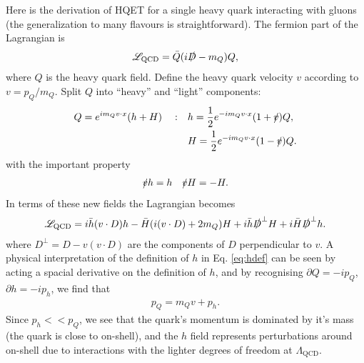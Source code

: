 Here is the derivation of HQET for a single heavy quark interacting with gluons (the generalization to many flavours is straightforward). The fermion part of the Lagrangian is
\begin{align}
  \mathscr{L}_{\text{QCD}} = \bar{Q} ( i\slashed{D} - m_Q ) Q,
  \label{eq:dirac}
\end{align}
where $Q$ is the heavy quark field. Define the heavy quark velocity $v$ according to $v = p_Q/m_Q$. Split $Q$ into ``heavy'' and ``light'' components:
\begin{align}
  \label{eq:hdef}
  Q = e^{im_Q v\cdot x}(h + H)\quad : \quad &h = {1\over 2} e^{-im_Q v\cdot x} ( 1 + \slashed{v} ) Q, \\
  &H = {1\over 2} e^{-im_Q v\cdot x} ( 1 - \slashed{v} ) Q.
\end{align}
with the important property
\begin{align}
  \slashed{v} h = h \quad \slashed{v} H = - H.
\end{align}
In terms of these new fields the Lagrangian becomes
\begin{align}
  \mathscr{L}_{\text{QCD}} = i\bar{h} (v\cdot D) h - \bar{H} ( i(v\cdot D) + 2m_Q ) H
  + i \bar{h} \slashed{D}^{\perp} H + i \bar{H} \slashed{D}^{\perp} h.
  \label{eq:HQET_preintegral}
\end{align}
where $D^{\perp} = D - v(v\cdot D)$ are the components of $D$ perpendicular to $v$. %
A physical interpretation of the definition of $h$ in Eq. \eqref{eq:hdef} can be seen by acting a spacial derivative on the definition of $h$, and by recognising $\partial Q = -i p_Q$, $\partial h = -i p_h$, we find that
\begin{align}
  p_Q = m_Q v + p_h.
\end{align}
Since $p_h << p_Q$, we see that the quark's momentum is dominated by it's mass (the quark is close to on-shell), and the $h$ field represents perturbations around on-shell due to interactions with the lighter degrees of freedom at $\Lambda_{\text{QCD}}$.

